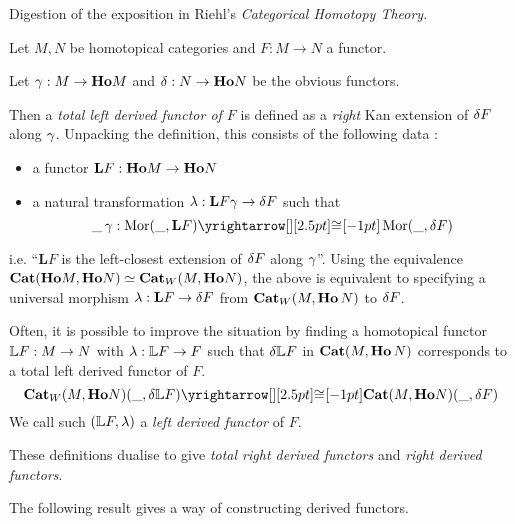 \documentclass[./main.tex]{subfiles}
\begin{document}
\begin{rmk}
  Digestion of the exposition in Riehl's \textit{Categorical Homotopy Theory}.
\end{rmk}
  
\begin{dfn}
  
  Let $M, N$ be homotopical categories and
  $F : M \to N$ a functor.

  Let $\gamma : M \to \mathbf{Ho} M$ and $\delta : N \to \mathbf{Ho} N$ be
  the obvious functors.

  Then a \emph{total left derived functor of $F$} is defined as
  a \emph{right} Kan extension of $\delta F$ along $\gamma$.
  Unpacking the definition, this consists of the following data : 
  \begin{itemize}
    \item a functor $\mathbf{L} F : \mathbf{Ho} M \to \mathbf{Ho} N$
    \item a natural transformation $\lambda : \mathbf{L} F \gamma \to \delta F$ such that
    \[
      \_\, \ga : \MOR (\_ , \mathbf{L} F) \map{\iso}{} \MOR (\_ , \de F)
    \]
  \end{itemize}
  i.e. ``$\mathbf{L} F$ is the left-closest extension of $\delta F$ along $\gamma$''.
  Using the equivalence $\mathbf{Cat}(\mathbf{Ho} M , \mathbf{Ho} N) \simeq \mathbf{Cat}_W (M , \mathbf{Ho} N)$,
  the above is equivalent to specifying 
  a universal morphism $\lambda : \mathbf{L} F \to \delta F$
  from $\mathbf{Cat}_W (M , \mathbf{Ho} \, N)$ to $\delta F$.

  Often, it is possible to improve the situation by finding
  a homotopical functor $\mathbb{L} F : M \to N$ with $\lambda : \mathbb{L} F \to F$ 
  such that $\delta \mathbb{L} F$ in $\mathbf{Cat}(M , \mathbf{Ho}\, N)$ corresponds to 
  a total left derived functor of $F$.
  \[
    \CAT_W (M , \HO N) ( \_ , \de \bb{L} F) 
    \map{\iso}{} \CAT (M , \HO N) ( \_ , \de F)
  \]
  We call such $(\mathbb{L} F , \lambda)$ a \emph{left derived functor} of $F$.

  These definitions dualise to give 
  \emph{total right derived functors} and \emph{right derived functors}.
\end{dfn}

\begin{rmk}
  
  The following result gives a way of constructing derived functors.
\end{rmk}
\end{document}
